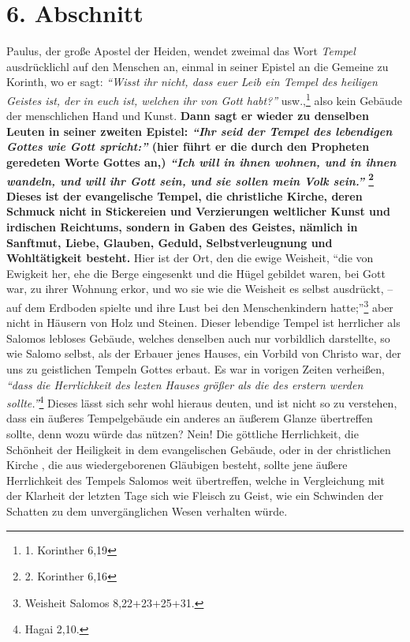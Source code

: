 \section{6. Abschnitt} \label{kap5_ab6}

 
Paulus, der große Apostel der Heiden, wendet zweimal das Wort \textit{Tempel}
ausdrücklichl auf den Menschen an, einmal in seiner Epistel an die Gemeine zu
Korinth, wo er sagt:
\textit{"`Wisst ihr nicht, dass euer Leib ein Tempel des heiligen
Geistes ist, der in euch ist, welchen ihr von Gott habt?"'} usw.,\footnote{1.
Korinther 6,19}
also kein Gebäude der menschlichen Hand und Kunst.
\label{ref:05_06_tempel}
\textbf{Dann sagt er
wieder zu denselben Leuten in seiner zweiten Epistel:
\textit{"`Ihr seid der Tempel des lebendigen Gottes wie Gott spricht:"'} (hier
führt er die durch den Propheten
geredeten Worte Gottes an,)
\textit{"`Ich will in ihnen wohnen, und in ihnen wandeln, und will ihr Gott
sein, und sie sollen mein Volk sein."'}
\footnote{2. Korinther 6,16}
Dieses ist der
evangelische Tempel, die christliche Kirche, deren
Schmuck nicht in Stickereien
und Verzierungen weltlicher Kunst und irdischen Reichtums, sondern in Gaben des
Geistes, nämlich in Sanftmut, Liebe, Glauben, Geduld,
Selbstverleugnung und
Wohltätigkeit besteht.} Hier ist der Ort, den die ewige Weisheit, "`die von
Ewigkeit her, ehe die Berge eingesenkt und die Hügel gebildet waren, bei Gott
war, zu ihrer Wohnung erkor, und wo sie wie die Weisheit es selbst ausdrückt, --
auf dem Erdboden spielte und ihre Lust bei den Menschenkindern
hatte;"'\footnote{Weisheit Salomos 8,22+23+25+31.}
aber nicht in Häusern von Holz
und Steinen. Dieser lebendige Tempel ist herrlicher als Salomos lebloses
Gebäude, welches denselben auch nur vorbildlich darstellte, so wie Salomo
selbst, als der Erbauer jenes Hauses, ein Vorbild von Christo war, der uns zu
geistlichen Tempeln Gottes erbaut. Es war in vorigen Zeiten verheißen,
\textit{"`dass die Herrlichkeit des lezten Hauses größer als die des erstern
werden
sollte."'}\footnote{Hagai 2,10.}
Dieses lässt sich sehr wohl hieraus deuten, und
ist nicht so zu verstehen, dass ein äußeres Tempelgebäude ein anderes an äußerem
Glanze übertreffen sollte, denn wozu würde das nützen? Nein! Die göttliche
Herrlichkeit, die Schönheit der Heiligkeit in dem evangelischen Gebäude, oder in
der christlichen Kirche ,
die aus wiedergeborenen  Gläubigen besteht, sollte jene
äußere Herrlichkeit des Tempels Salomos weit übertreffen, welche in
Vergleichung mit der Klarheit der letzten Tage sich wie Fleisch zu Geist, wie
ein Schwinden der Schatten zu dem unvergänglichen Wesen verhalten würde.


